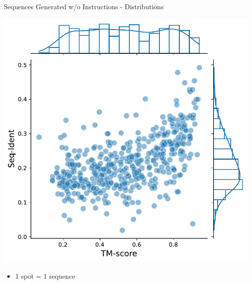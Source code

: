 \documentclass[dvipsnames]{beamer}
\begin{document}
\begin{frame}{Sequences Generated w/o Instructions - Distributions}
\begin{center}
		\includegraphics[scale=0.35]{images/tm_sid.pdf}
	\end{center}
	\begin{itemize}
		\item 1 spot = 1 sequence
	\end{itemize}
\end{frame}


\end{document}
